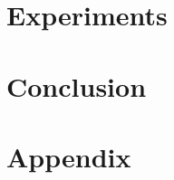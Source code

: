 \documentclass[nohyperref]{article}
\theoremstyle{plain}
\theoremstyle{definition}
\theoremstyle{remark}
\begin{document}
\section{Experiments}\label{sec:experiments}


\section{Conclusion}\label{sec:conclusion}

\FloatBarrier







\newpage
\appendix
\onecolumn
\section{Appendix}
\label{sec:appendix}


\end{document}

